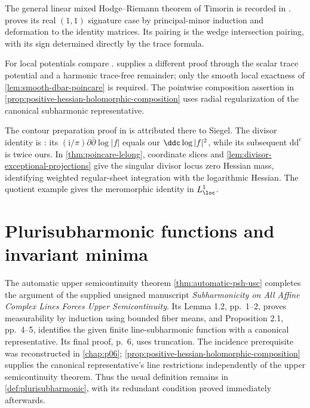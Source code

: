 The general linear mixed Hodge--Riemann theorem of Timorin is recorded in \cite[Proposition 2.1, p.~4]{DN2005mixedv2}.  proves its real $(1,1)$ signature case by principal-minor induction and deformation to the identity matrices. Its pairing is the wedge intersection pairing, with its sign determined directly by the trace formula.


For local potentials compare \cite[Chapter III, Section 1.18 and (1.19), p.~135]{DemBook}.  supplies a different proof through the scalar trace potential and a harmonic trace-free remainder; only the smooth local exactness of \cref{lem:smooth-dbar-poincare} is required. The pointwise composition assertion in \cref{prop:positive-hessian-holomorphic-composition} uses radial regularization of the canonical subharmonic representative.

The contour preparation proof in \cite[Chapter II, Section 2.A, pp.~79--80, Theorem (2.1)]{DemBook} is attributed there to Siegel. The divisor identity is \cite[Chapter III, (2.15), pp.~143--144]{DemBook}: its $(\mathrm{i}/\pi)\partial\bar\partial\log|f|$ equals our $\ddc\log|f|^2$, while its subsequent $\mathrm{dd}^{\mathrm c}$ is twice ours. In \cref{thm:poincare-lelong}, coordinate slices and \cref{lem:divisor-exceptional-projections} give the singular divisor locus zero Hessian mass, identifying weighted regular-sheet integration with the logarithmic Hessian. The quotient example gives the meromorphic identity in $L^1_{\loc}$.

\section{Plurisubharmonic functions and invariant minima}
\label{sec:history-plurisubharmonic}
The automatic upper semicontinuity theorem \cref{thm:automatic-psh-usc} completes the argument of the supplied unsigned manuscript \emph{Subharmonicity on All Affine Complex Lines Forces Upper Semicontinuity}. Its Lemma 1.2, pp.~1--2, proves measurability by induction using bounded fiber means, and Proposition 2.1, pp.~4--5, identifies the given finite line-subharmonic function with a canonical representative. Its final proof, p.~6, uses truncation. The incidence prerequisite was reconstructed in \cref{chap:p06}; \cref{prop:positive-hessian-holomorphic-composition} supplies the canonical representative's line restrictions independently of the upper semicontinuity theorem. Thus the usual definition remains in \cref{def:plurisubharmonic}, with its redundant condition proved immediately afterwards.

